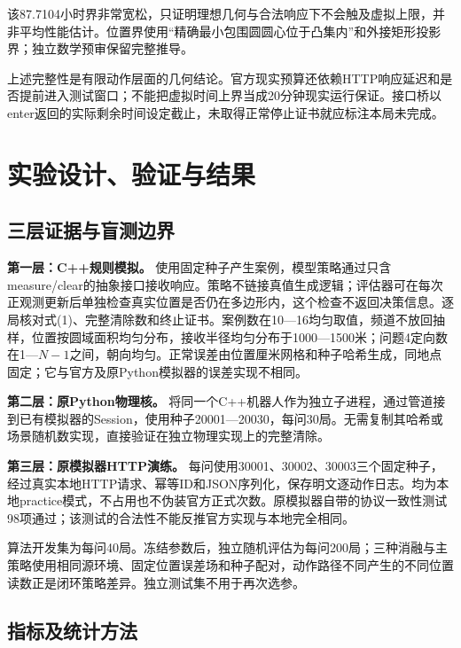 \documentclass[
  chinese,
  UTF8,
  a4paper,
  zihao=-4]{ctexart}
\begin{document}
该87.7104小时界非常宽松，只证明理想几何与合法响应下不会触及虚拟上限，并非平均性能估计。位置界使用``精确最小包围圆圆心位于凸集内''和外接矩形投影界；独立数学预审保留完整推导。

上述完整性是有限动作层面的几何结论。官方现实预算还依赖HTTP响应延迟和是否提前进入测试窗口；不能把虚拟时间上界当成20分钟现实运行保证。接口桥以enter返回的实际剩余时间设定截止，未取得正常停止证书就应标注本局未完成。

\section{实验设计、验证与结果}\label{ux5b9eux9a8cux8bbeux8ba1ux9a8cux8bc1ux4e0eux7ed3ux679c}

\subsection{三层证据与盲测边界}\label{ux4e09ux5c42ux8bc1ux636eux4e0eux76f2ux6d4bux8fb9ux754c}

\textbf{第一层：C++规则模拟。}
使用固定种子产生案例，模型策略通过只含measure/clear的抽象接口接收响应。策略不链接真值生成逻辑；评估器可在每次正观测更新后单独检查真实位置是否仍在多边形内，这个检查不返回决策信息。逐局核对式(1)、完整清除数和终止证书。案例数在10---16均匀取值，频道不放回抽样，位置按圆域面积均匀分布，接收半径均匀分布于1000---1500米；问题4定向数在1---\(N-1\)之间，朝向均匀。正常误差由位置厘米网格和种子哈希生成，同地点固定；它与官方及原Python模拟器的误差实现不相同。

\textbf{第二层：原Python物理核。}
将同一个C++机器人作为独立子进程，通过管道接到已有模拟器的Session，使用种子20001---20030，每问30局。无需复制其哈希或场景随机数实现，直接验证在独立物理实现上的完整清除。

\textbf{第三层：原模拟器HTTP演练。}
每问使用30001、30002、30003三个固定种子，经过真实本地HTTP请求、幂等ID和JSON序列化，保存明文逐动作日志。均为本地practice模式，不占用也不伪装官方正式次数。原模拟器自带的协议一致性测试98项通过；该测试的合法性不能反推官方实现与本地完全相同。

算法开发集为每问40局。冻结参数后，独立随机评估为每问200局；三种消融与主策略使用相同源环境、固定位置误差场和种子配对，动作路径不同产生的不同位置读数正是闭环策略差异。独立测试集不用于再次选参。

\subsection{指标及统计方法}\label{ux6307ux6807ux53caux7edfux8ba1ux65b9ux6cd5}
\end{document}
